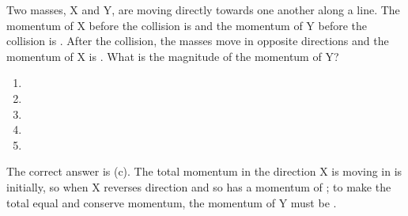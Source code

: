 

\begin{problem}
{Two masses, X and Y, are moving directly towards one another along a line. The momentum of X before the collision is  and the momentum of Y before the collision is . After the collision, the masses move in opposite directions and the momentum of X is . What is the magnitude of the momentum of Y?
\begin{enumerate}
	\item {}
	\item {}
	\item {} \answer
	\item {}
	\item {}
\end{enumerate}
}
{}
{The correct answer is (c). The total momentum in the direction X is moving in is  initially, so when X reverses direction and so has a momentum of ; to make the total equal  and conserve momentum, the momentum of Y must be .}
\end{problem}
